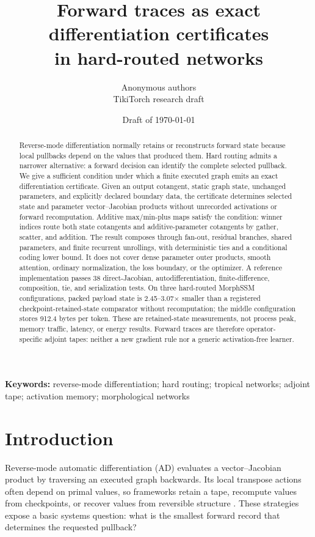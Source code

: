 \documentclass[10pt]{article}
\title{Forward traces as exact differentiation certificates\\
in hard-routed networks}
\author{Anonymous authors\\TikiTorch research draft}
\date{Draft of \today}
\begin{document}
\maketitle

\begin{abstract}
Reverse-mode differentiation normally retains or reconstructs forward state
because local pullbacks depend on the values that produced them.  Hard routing
admits a narrower alternative: a forward decision can identify the complete
selected pullback.  We give a sufficient condition under which a finite
executed graph emits an exact differentiation certificate.  Given an output
cotangent, static graph state, unchanged parameters, and explicitly declared
boundary data, the certificate determines selected state and parameter
vector--Jacobian products without unrecorded activations or forward
recomputation.  Additive max/min-plus maps satisfy the condition: winner
indices route both state cotangents and additive-parameter cotangents by
gather, scatter, and addition.  The result composes through fan-out, residual
branches, shared parameters, and finite recurrent unrollings, with deterministic
ties and a conditional coding lower bound.  It does not cover dense parameter
outer products, smooth attention, ordinary normalization, the loss boundary,
or the optimizer.  A reference implementation passes 38 direct-Jacobian,
autodifferentiation, finite-difference, composition, tie, and serialization
tests.  On three hard-routed MorphSSM configurations, packed payload state is
2.45--3.07$\times$ smaller than a registered checkpoint-retained-state
comparator without recomputation; the middle configuration stores 912.4 bytes
per token.  These are retained-state measurements, not process peak, memory
traffic, latency, or energy results.  Forward traces are therefore
operator-specific adjoint tapes: neither a new gradient rule nor a generic
activation-free learner.
\end{abstract}

\noindent\textbf{Keywords:} reverse-mode differentiation; hard routing;
tropical networks; adjoint tape; activation memory; morphological networks

\section{Introduction}

Reverse-mode automatic differentiation (AD) evaluates a vector--Jacobian
product by traversing an executed graph backwards.  Its local transpose
actions often depend on primal values, so frameworks retain a tape, recompute
values from checkpoints, or recover values from reversible structure
\citep{giering1998recipes,griewank2000revolve,chen2016sublinear,gomez2017reversible}.
These strategies expose a basic systems question: what is the smallest forward
record that determines the requested pullback?
\end{document}

